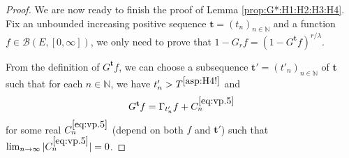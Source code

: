 \documentclass[12pt,a4paper]{amsart}
\numberwithin{equation}{section}
\theoremstyle{plain}
\theoremstyle{definition}
\theoremstyle{remark}
\begin{document}
\begin{proof}
	We are now ready to finish the proof of Lemma \ref{prop:G*:H1:H2:H3:H4}.
	Fix an unbounded increasing positive sequence $\mathbf t=(t_n)_{n\in \mathbb N}$ and a function $f\in \mathcal B(E,[0,\infty])$, we only need to  prove that $1-G_r f =(1- G^{\mathbf t}f)^{r/\lambda}.$
	
	From the definition of $G^{\mathbf t} f$, we can choose a subsequence $\mathbf t'=(t'_n)_{n \in \mathbb N}$ of $\mathbf t$ such that for each $n\in \mathbb N$, we have $t'_n > T^{\eqref{asp:H4!}}$ and
\begin{equation} \label{eq:vp.5}
	G^{\mathbf t}f = \Gamma_{t_n'}f + C^{\eqref{eq:vp.5}}_n
\end{equation}
	for some real $C^{\eqref{eq:vp.5}}_n$ (depend on both $f$ and $\mathbf t'$) such that $\lim_{n\to \infty} |C^{\eqref{eq:vp.5}}_n| =0$.
	

\end{proof}
\end{document}
